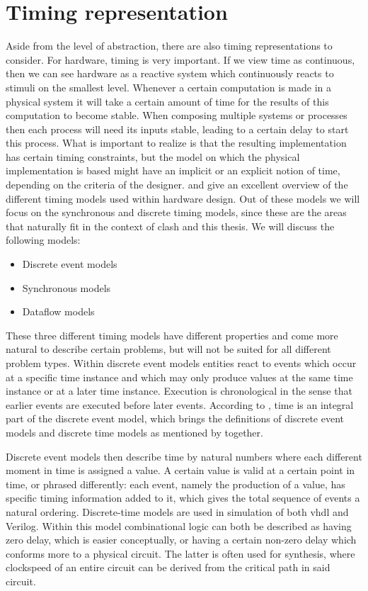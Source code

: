 \section{Timing representation}
Aside from the level of abstraction, there are also timing representations to consider. 
For hardware, timing is very important. 
If we view time as continuous, then we can see hardware as a reactive system which continuously reacts to stimuli on the smallest level.
Whenever a certain computation is made in a physical system it will take a certain amount of time for the results of this computation to become stable.
When composing multiple systems or processes then each process will need its inputs stable, leading to a certain delay to start this process. 
What is important to realize is that the resulting implementation has certain timing constraints, but the model on which the physical implementation is based might have an implicit or an explicit notion of time, depending on the criteria of the designer.
\cite{jantsch2005models} and \cite{chang1997heterogeneous} give an excellent overview of the different timing models used within hardware design.
Out of these models we will focus on the synchronous and discrete timing models, since these are the areas that naturally fit in the context of \gls{clash} and this thesis.
We will discuss the following models:
\begin{itemize}
 \item Discrete event models
 \item Synchronous models
 \item Dataflow models
\end{itemize}

These three different timing models have different properties and come more natural to describe certain problems, but will not be suited for all different problem types. 
Within discrete event models entities react to events which occur at a specific time instance and which may only produce values at the same time instance or at a later time instance. 
Execution is chronological in the sense that earlier events are executed before later events.
According to \cite{chang1997heterogeneous}, time is an integral part of the discrete event model, which brings the definitions of discrete event models and discrete time models as mentioned by \cite{jantsch2005models} together.

Discrete event models then describe time by natural numbers where each different moment in time is assigned a value. 
A certain value is valid at a certain point in time, or phrased differently: each event, namely the production of a value, has specific timing information added to it, which gives the total sequence of events a natural ordering. 
Discrete-time models are used in simulation of both \gls{vhdl} and Verilog. 
Within this model combinational logic can both be described as having zero delay, which is easier conceptually, or having a certain non-zero delay which conforms more to a physical circuit. 
The latter is often used for synthesis, where clockspeed of an entire circuit can be derived from the critical path in said circuit. 

